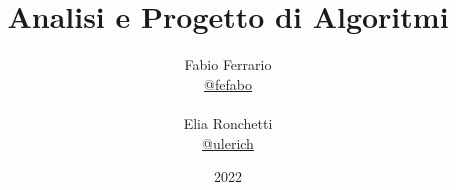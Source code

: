 \documentclass[12pt, a4paper, openany]{book}
\begin{document}
\title{Analisi e Progetto di Algoritmi}
\author{
	Fabio Ferrario\\
	\small{\href{https://t.me/fefabo}{@fefabo}}
	\\\\Elia Ronchetti\\
	\small{\href{https://t.me/ulerich}{@ulerich}}
}
\date{2022}
\maketitle

\tableofcontents






\end{document}
